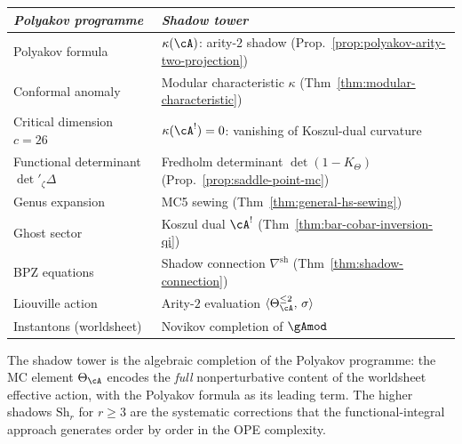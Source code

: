 \begin{remark}
\label{rem:polyakov-programme-summary}
\begin{center}
\small
\renewcommand{\arraystretch}{1.25}
\begin{tabular}{@{}ll@{}}
\toprule
\emph{Polyakov programme} & \emph{Shadow tower} \\
\midrule
Polyakov formula
  & $\kappa(\cA)$: arity-$2$ shadow
    \textup{(Prop.~\ref{prop:polyakov-arity-two-projection})} \\
Conformal anomaly
  & Modular characteristic $\kappa$
    \textup{(Thm~\ref{thm:modular-characteristic})} \\
Critical dimension $c = 26$
  & $\kappa(\cA^!) = 0$: vanishing of Koszul-dual
    curvature \\
Functional determinant
  $\det'{}_\zeta\Delta$
  & Fredholm determinant $\det(1 - K_\Theta)$
    \textup{(Prop.~\ref{prop:saddle-point-mc})} \\
Genus expansion
  & MC5 sewing
    \textup{(Thm~\ref{thm:general-hs-sewing})} \\
Ghost sector
  & Koszul dual $\cA^!$
    \textup{(Thm~\ref{thm:bar-cobar-inversion-qi})} \\
BPZ equations
  & Shadow connection
    $\nabla^{\mathrm{sh}}$
    \textup{(Thm~\ref{thm:shadow-connection})} \\
Liouville action
  & Arity-$2$ evaluation
    $\langle \Theta_\cA^{\leq 2},\,\sigma \rangle$ \\
Instantons (worldsheet)
  & Novikov completion of $\gAmod$ \\
\bottomrule
\end{tabular}
\end{center}
\noindent
The shadow tower is the algebraic completion of the Polyakov
programme: the MC element $\Theta_\cA$ encodes the
\emph{full} nonperturbative content of the worldsheet
effective action, with the Polyakov formula as its leading
term.  The higher shadows $\mathrm{Sh}_r$ for $r \geq 3$
are the systematic corrections that the functional-integral
approach generates order by order in the OPE complexity.
\end{remark}

